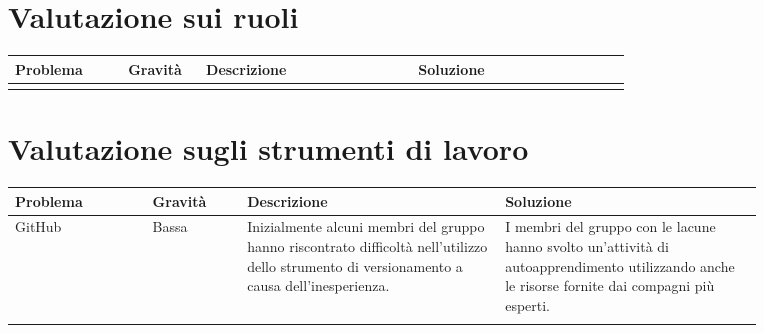 \section{Valutazione sui ruoli}
\begin{table}[H]
    \centering
    \begin{tabular}{|p{0.16\linewidth}|p{0.11\linewidth}|p{0.3\linewidth}|p{0.3\linewidth}|}
    \hline
    \rowcolor[HTML]{036400}
    {\color[HTML]{FFFFFF} \textbf{Problema}} & {\color[HTML]{FFFFFF} \textbf{Gravità}} & {\color[HTML]{FFFFFF} \textbf{Descrizione}} & {\color[HTML]{FFFFFF} \textbf{Soluzione}} \\ \hline
    \rowcolor[HTML]{EFEFEF}
    &  & & \\ \hline
    \end{tabular}
\end{table}


\section{Valutazione sugli strumenti di lavoro}
    \begin{table}[H]
        \centering
        \begin{tabular}{|p{0.16\linewidth}|p{0.11\linewidth}|p{0.3\linewidth}|p{0.3\linewidth}|}
        \hline
        \rowcolor[HTML]{036400}
        {\color[HTML]{FFFFFF} \textbf{Problema}} & {\color[HTML]{FFFFFF} \textbf{Gravità}} & {\color[HTML]{FFFFFF} \textbf{Descrizione}} & {\color[HTML]{FFFFFF} \textbf{Soluzione}} \\ \hline
        \rowcolor[HTML]{EFEFEF}
        GitHub& Bassa & Inizialmente alcuni membri del gruppo hanno riscontrato difficoltà nell'utilizzo dello strumento di versionamento a causa dell'inesperienza. & I membri del gruppo con le lacune hanno svolto un'attività di autoapprendimento utilizzando anche le risorse fornite dai compagni più esperti. \\ \hline
        \rowcolor[HTML]{C0C0C0}
        \end{tabular}
    \end{table}
